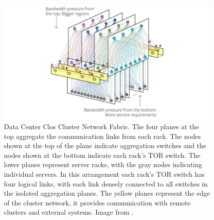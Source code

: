 \begin{figure} [!h]
\centering
\includegraphics[scale=6]{methodology/images/fb_clos.jpg}
\caption[DC Clos Network]{Data Center Clos Cluster Network Fabric. The four planes at the top aggregate the communication links from each rack. The nodes shown at the top of the plane indicate aggregation switches and the nodes shown at the bottom indicate each rack's TOR switch. The lower planes represent server racks, with the gray nodes indicating individual servers. In this arrangement each rack's TOR switch has four logical links, with each link densely connected to all switches in the isolated aggregation planes. The yellow planes represent the edge of the cluster network, it provides communication with remote clusters and external systems. Image from  \cite{fb_clos}.}
\label{img_fb_clos}
\end{figure}